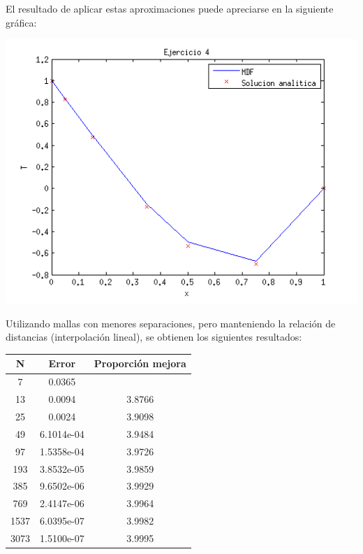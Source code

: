 \documentclass{article}
\begin{document}
\begin{enumerate}[1)]
{        El resultado de aplicar estas aproximaciones puede apreciarse en la siguiente gráfica:

        \includegraphics[width=\textwidth]{ej4.png}

        Utilizando mallas con menores separaciones, pero manteniendo la relación de distancias
        (interpolación lineal), se obtienen los siguientes resultados:

        \begin{tabular}{|c|c|c|}
            \hline
            \textbf{N} & \textbf{Error} & \textbf{Proporción mejora} \\
            \hline
            7 & 0.0365 & \\
            \hline
            13 & 0.0094 & 3.8766 \\
            \hline
            25 & 0.0024 & 3.9098 \\
            \hline
            49 & 6.1014e-04 & 3.9484 \\
            \hline
            97 & 1.5358e-04 & 3.9726 \\
            \hline
            193 & 3.8532e-05 & 3.9859 \\
            \hline
            385 & 9.6502e-06 & 3.9929 \\
            \hline
            769 & 2.4147e-06 & 3.9964 \\
            \hline
            1537 & 6.0395e-07 & 3.9982 \\
            \hline
            3073 & 1.5100e-07 & 3.9995 \\
            \hline
        \end{tabular}

}
\end{enumerate}
\end{document}
